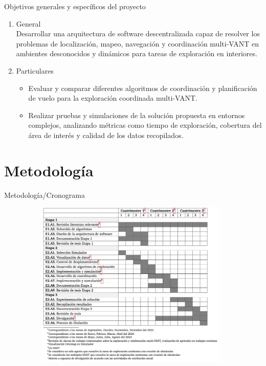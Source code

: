 \documentclass[
  24pt, %
  aspectratio=169, %
]{beamer}
\begin{document}
\begin{frame}{Objetivos generales y específicos del proyecto}
  \begin{enumerate}
  \item<1-> General \\
    \bigskip
    Desarrollar una arquitectura de software descentralizada capaz de resolver los problemas de localización, mapeo, navegación y coordinación multi-VANT en ambientes desconocidos y dinámicos para tareas de exploración en interiores.
    \pause
  \item<2-> Particulares\\
    \bigskip
    \begin{itemize}
    \item Evaluar y comparar diferentes algoritmos de coordinación y planificación de vuelo para la exploración coordinada multi-VANT.
      \pause
    \item Realizar pruebas y simulaciones de la solución propuesta en entornos complejos, analizando métricas como tiempo de exploración, cobertura del área de interés y calidad de los datos recopilados.
      
    \end{itemize}
  \end{enumerate}
\end{frame}

\section{Metodología}
\begin{frame}{Metodología/Cronograma}
  \begin{figure}
    \centering
    \includegraphics[width=11cm, height=8cm]{cronograma}
  \end{figure}
\end{frame}
\end{document}
